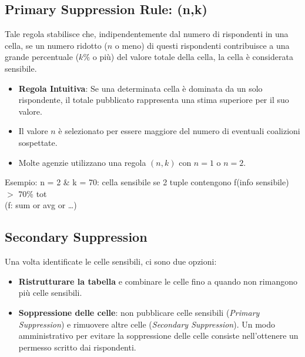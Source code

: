 \documentclass{report}
\begin{document}
\subsection{Primary Suppression Rule: (n,k)}
Tale regola stabilisce che, indipendentemente dal numero di rispondenti in una cella, se un numero ridotto (\( n \) o meno) di questi rispondenti contribuisce a una grande percentuale (\( k\% \) o più) del valore totale della cella, la cella è considerata sensibile.

\begin{itemize}
    \item \textbf{Regola Intuitiva}: Se una determinata cella è dominata da un solo rispondente, il totale pubblicato rappresenta una stima superiore per il suo valore.
    \item Il valore \( n \) è selezionato per essere maggiore del numero di eventuali coalizioni sospettate.
    \item Molte agenzie utilizzano una regola \( (n,k) \) con \( n = 1 \) o \( n = 2 \).
\end{itemize}

\noindent Esempio: n = 2 \& k = 70: cella sensibile se 2 tuple contengono f(info sensibile) $>$ 70\% tot \\ (f: sum or avg or \dots)

\subsection{Secondary Suppression}
Una volta identificate le celle sensibili, ci sono due opzioni:
\begin{itemize}
    \item \textbf{Ristrutturare la tabella} e combinare le celle fino a quando non rimangono più celle sensibili.
    \item \textbf{Soppressione delle celle}: non pubblicare celle sensibili (\textit{Primary Suppression}) e rimuovere altre celle (\textit{Secondary Suppression}). 
    Un modo amministrativo per evitare la soppressione delle celle consiste nell'ottenere un permesso scritto dai rispondenti.
\end{itemize}
\end{document}
